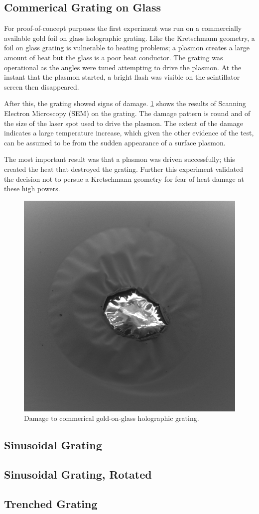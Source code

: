 \subsection{Commerical Grating on Glass}

For proof-of-concept purposes the first experiment was run on a commercially available gold foil on glass holographic grating.
Like the Kretschmann geometry, a foil on glass grating is vulnerable to heating problems; a plasmon creates a large amount of heat but the glass is a poor heat conductor.
The grating was operational as the angles were tuned attempting to drive the plasmon.
At the instant that the plasmon started, a bright flash was visible on the scintillator screen then disappeared.

After this, the grating showed signs of damage.
\ref{fig:grating-damage} shows the results of Scanning Electron Microscopy (SEM) on the grating.
The damage pattern is round and of the size of the laser spot used to drive the plasmon.
The extent of the damage indicates a large temperature increase, which given the other evidence of the test, can be assumed to be from the sudden appearance of a surface plasmon.

The most important result was that a plasmon was driven successfully; this created the heat that destroyed the grating.
Further this experiment validated the decision not to persue a Kretschmann geometry for fear of heat damage at these high powers.

\begin{figure}
  \centering
  \includegraphics{damage.png}
  \caption{Damage to commerical gold-on-glass holographic grating.}
  \label{fig:grating-damage}
\end{figure}

\subsection{Sinusoidal Grating}

\subsection{Sinusoidal Grating, Rotated}

\subsection{Trenched Grating}

